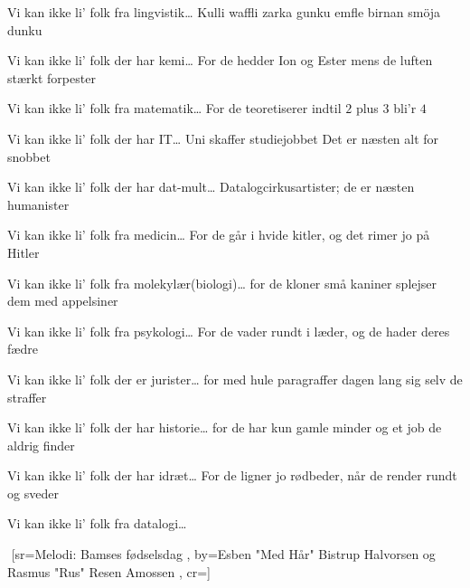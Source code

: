 \documentclass[pdftex,12pt]{article}
\begin{document}
\begin{songs}{}
\endverse
\beginverse
Vi kan ikke li' folk fra lingvistik\ldots
Kulli waffli zarka gunku
emfle birnan smöja dunku

\endverse
\beginverse
Vi kan ikke li' folk der har kemi\ldots
For de hedder Ion og Ester
mens de luften stærkt forpester

\endverse
\beginverse
Vi kan ikke li' folk fra matematik\ldots
For de teoretiserer
indtil $2$ plus $3$ bli'r $4$

\endverse
\beginverse
Vi kan ikke li' folk der har IT\ldots
Uni skaffer studiejobbet
Det er næsten alt for snobbet

\endverse
\beginverse
Vi kan ikke li' folk der har dat-mult\ldots
Datalogcirkusartister;
de er næsten humanister

\endverse



\beginverse
Vi kan ikke li' folk fra medicin\ldots
For de går i hvide kitler,
og det rimer jo på Hitler

\endverse
\beginverse
Vi kan ikke li' folk fra molekylær(biologi)\ldots
for de kloner små kaniner
splejser dem med appelsiner

\endverse
\beginverse
Vi kan ikke li' folk fra psykologi\ldots
For de vader rundt i læder,
og de hader deres fædre

\endverse
\beginverse
Vi kan ikke li' folk der er jurister\ldots
for med hule paragraffer
dagen lang sig selv de straffer

\endverse
\beginverse
Vi kan ikke li' folk der har historie\ldots
for de har kun gamle minder
og et job de aldrig finder

\endverse
\beginverse
Vi kan ikke li' folk der har idræt\ldots
For de ligner jo rødbeder,
når de render rundt og sveder

\endverse
\beginverse
Vi kan ikke li' folk fra datalogi\ldots

\endverse
\endsong


﻿%
[sr={Melodi: Bamses fødselsdag}
,
by={Esben "Med Hår" Bistrup Halvorsen og Rasmus "Rus" Resen Amossen}
,
cr={}]\hypertarget{Den kanoniske matematikersang}{}
\label{song1}


\end{songs}
\end{document}
